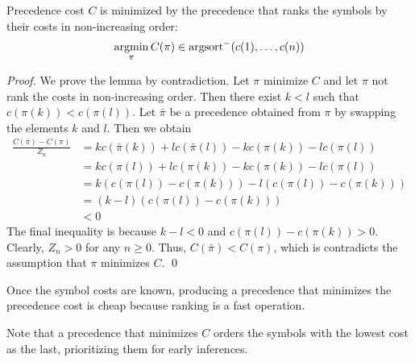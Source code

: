 \begin{lemma}
Precedence cost $C$ is minimized by the precedence that ranks the symbols by their costs in non-increasing order:
$$
\operatorname*{argmin}_\pi C(\pi) \in \operatorname{argsort}^- (c(1), \ldots, c(n))
$$
\end{lemma}

\begin{proof}
We prove the lemma by contradiction.
Let $\pi$ minimize $C$ and let $\pi$ not rank the costs in non-increasing order.
Then there exist $k < l$ such that $c(\pi(k)) < c(\pi(l))$.
Let $\bar{\pi}$ be a precedence obtained from $\pi$ by swapping the elements $k$ and $l$.
Then we obtain
\begin{align*}
\frac{C(\bar{\pi}) - C(\pi)}{Z_n}
&= kc(\bar{\pi}(k)) + lc(\bar{\pi}(l)) - kc(\pi(k)) - lc(\pi(l)) \\
&= kc(\pi(l)) + lc(\pi(k)) - kc(\pi(k)) - lc(\pi(l)) \\
&= k(c(\pi(l)) - c(\pi(k))) - l(c(\pi(l)) - c(\pi(k))) \\
&= (k-l) (c(\pi(l)) - c(\pi(k))) \\
&< 0
\end{align*}
The final inequality is because $k-l < 0$ and $c(\pi(l)) - c(\pi(k)) > 0$.
Clearly, $Z_n > 0$ for any $n \geq 0$.
Thus, $C(\bar{\pi}) < C(\pi)$, which is contradicts the assumption that $\pi$ minimizes $C$. \qed
\end{proof}

Once the symbol costs are known,
producing a precedence that minimizes the precedence cost is cheap
because ranking is a fast operation.

Note that a precedence that minimizes $C$
orders the symbols with the lowest cost as the last, prioritizing them for early inferences.



